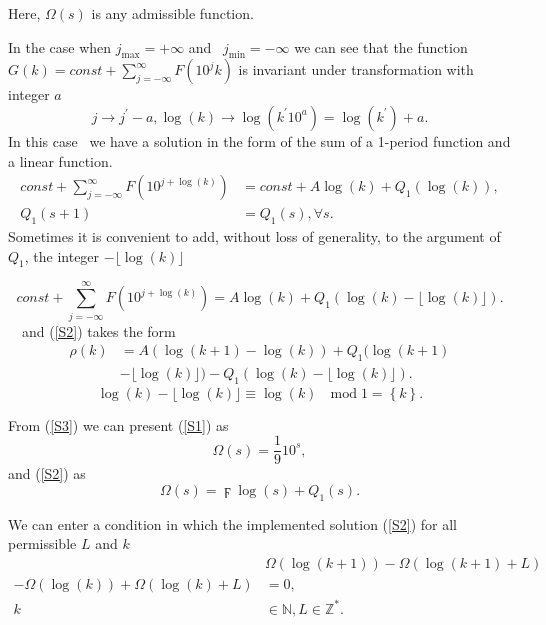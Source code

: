 \documentclass[titlepage,fleqn]{article}%
\providecommand{\U}[1]{\protect\rule{.1in}{.1in}}
\begin{document}
\noindent Here, $\Omega(s)$ is any admissible function.

In the case when $j_{\max}=+\infty$ and \ $j_{\min}=-\infty$ we can see that
the function $G(k)=const+%
{\displaystyle\sum\limits_{j=-\infty}^{\infty}}
F(10^{j}k)$ is invariant under transformation with integer $a$
\[
j\rightarrow j^{\prime}-a,\log(k)\rightarrow\log(k^{\prime}10^{a}%
)=\log(k^{\prime})+a.
\]
In this case \ we have a solution in the form of the sum of a 1-period
function and a linear function.%
\begin{align*}
const+%
{\displaystyle\sum\limits_{j=-\infty}^{\infty}}
F(10^{j+\log(k)})  &  =const+A\log(k)+Q_{1}(\log(k)),\\
Q_{1}(s+1)  &  =Q_{1}(s),\forall s.\text{ }%
\end{align*}
Sometimes it is convenient to add, without loss of generality, to the argument
of $Q_{1}$, the integer $-\lfloor\log(k)\rfloor$%

\[
const+%
{\displaystyle\sum\limits_{j=-\infty}^{\infty}}
F(10^{j+\log(k)})=A\log(k)+Q_{1}(\log(k)-\lfloor\log(k)\rfloor).
\]
\ \ and (\ref{S2}) takes the form%
\begin{align}
\rho(k)  &  =A\left(  \log(k+1)-\log(k)\right)  +Q_{1}(\log(k+1)\label{S2a}\\
&  -\lfloor\log(k)\rfloor)-Q_{1}(\log(k)-\lfloor\log(k)\rfloor).\nonumber
\end{align}%
\[
\log(k)-\lfloor\log(k)\rfloor\equiv\log(k)\text{ }\operatorname{mod}\text{
}1=\left\{  k\right\}  .
\]


From (\ref{S3}) we can present (\ref{S1}) as%
\[
\Omega(s)=\frac{1}{9}10^{s},
\]
and (\ref{S2}) as%
\begin{equation}
\Omega(s)=\digamma\log(s)+Q_{1}(s). \label{S2b}%
\end{equation}


We can enter a condition in which the implemented solution (\ref{S2}) for all
permissible $L$ and $k$%
\begin{align}
&  \Omega(\log(k+1))-\Omega(\log(k+1)+L)\label{S2c}\\
-\Omega(\log(k))+\Omega(\log(k)+L)  &  =0,\nonumber\\
k  &  \in%
\mathbb{N}
,L\in%
\mathbb{Z}
^{\ast}.\nonumber
\end{align}
\end{document}
